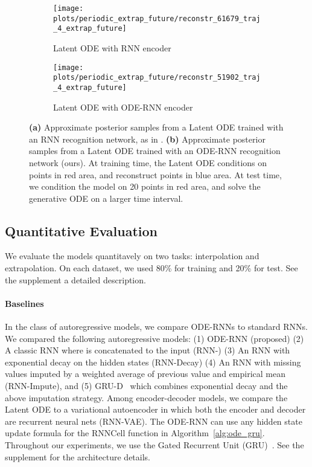 \documentclass{article}
\begin{document}
\begin{figure}[h]
	\centering
    \begin{subfigure}[b]{0.48\columnwidth}
    	\centering
    	\small
    	\caption{Latent ODE with RNN encoder}
        \texttt{[image: plots/periodic\_extrap\_future/reconstr\_61679\_traj\_4\_extrap\_future]}
    \end{subfigure}
\begin{subfigure}[b]{0.48\columnwidth}
    	\centering
    	\small
    	\caption{Latent ODE with ODE-RNN encoder}
        \texttt{[image: plots/periodic\_extrap\_future/reconstr\_51902\_traj\_4\_extrap\_future]}
    \end{subfigure}
\caption{\textbf{(a)} Approximate posterior samples from a Latent ODE trained with an RNN recognition network, as in \cite{NeuralODE}.
    \textbf{(b)} Approximate posterior samples from a Latent ODE trained with an ODE-RNN recognition network (ours).
    At training time, the Latent ODE conditions on points in red area, and reconstruct points in blue area.
    At test time, we condition the model on 20 points in red area, and solve the generative ODE on a larger time interval.}
    \label{fig:periodic_extrap}
\end{figure}




\subsection{Quantitative Evaluation}

We evaluate the models quantitavely on two tasks: interpolation and extrapolation.
On each dataset, we used 80\% for training and 20\% for test.
See the supplement a detailed description.

\paragraph{Baselines}
In the class of autoregressive models, we compare ODE-RNNs to standard RNNs.
We compared the following autoregressive models:
(1) ODE-RNN (proposed)
(2) A classic RNN where  is concatenated to the input (RNN-)
(3) An RNN with exponential decay on the hidden states  (RNN-Decay)
(4) An RNN with missing values imputed by a weighted average of previous value and empirical mean (RNN-Impute), and
(5) GRU-D~\citep{che_sontag_2018} which combines exponential decay and the above imputation strategy.
Among encoder-decoder models, we compare the Latent ODE to a variational autoencoder in which both the encoder and decoder are recurrent neural nets (RNN-VAE). 
The ODE-RNN can use any hidden state update formula for the RNNCell function in Algorithm~\ref{alg:ode_gru}.
Throughout our experiments, we use the Gated Recurrent Unit (GRU)~\citep{gru_cho_2014}. See the supplement for the architecture details.
\end{document}
